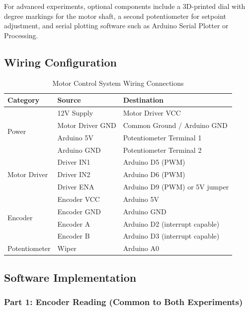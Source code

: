 For advanced experiments, optional components include a 3D-printed dial with degree markings for the motor shaft, a second potentiometer for setpoint adjustment, and serial plotting software such as Arduino Serial Plotter or Processing.

\subsection{Wiring Configuration}

\begin{table}[htbp]
\centering
\caption{Motor Control System Wiring Connections}
\label{tab:wiring}
\begin{tabular}{lll}
\toprule
\textbf{Category} & \textbf{Source} & \textbf{Destination} \\
\midrule
\multirow{4}{*}{Power} & 12V Supply & Motor Driver VCC \\
& Motor Driver GND & Common Ground / Arduino GND \\
& Arduino 5V & Potentiometer Terminal 1 \\
& Arduino GND & Potentiometer Terminal 2 \\
\midrule
\multirow{3}{*}{Motor Driver} & Driver IN1 & Arduino D5 (PWM) \\
& Driver IN2 & Arduino D6 (PWM) \\
& Driver ENA & Arduino D9 (PWM) or 5V jumper \\
\midrule
\multirow{4}{*}{Encoder} & Encoder VCC & Arduino 5V \\
& Encoder GND & Arduino GND \\
& Encoder A & Arduino D2 (interrupt capable) \\
& Encoder B & Arduino D3 (interrupt capable) \\
\midrule
Potentiometer & Wiper & Arduino A0 \\
\bottomrule
\end{tabular}
\end{table}

\subsection{Software Implementation}

\subsubsection{Part 1: Encoder Reading (Common to Both Experiments)}

